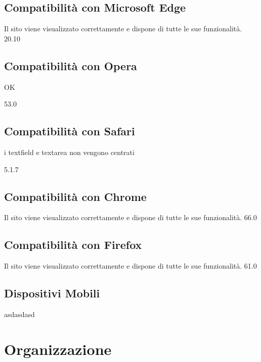 \documentclass[10pt, a4paper]{article}
\begin{document}
\subsection{Compatibilità con Microsoft Edge}
Il sito viene visualizzato correttamente e dispone di tutte le sue funzionalità. 20.10%

\subsection{Compatibilità con Opera}
OK 


53.0%

\subsection{Compatibilità con Safari}
i textfield e textarea non vengono centrati


5.1.7%

\subsection{Compatibilità con Chrome}
Il sito viene visualizzato correttamente e dispone di tutte le sue funzionalità. 66.0%

\subsection{Compatibilità con Firefox}
Il sito viene visualizzato correttamente e dispone di tutte le sue funzionalità. 61.0%

\subsection{Dispositivi Mobili}




asdasdasd
\section{Organizzazione}
\end{document}
